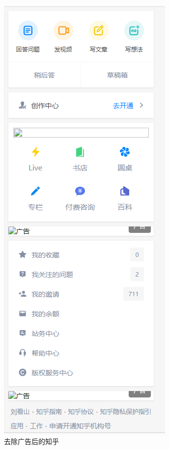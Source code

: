 \documentclass[UTF8]{article}
\begin{document}
\begin{minipage}{\linewidth/2}
\begin{figure}[H]
	\centering
	\includegraphics[width=\linewidth/3*2]{zhihu_noad.png}
	\caption{去除广告后的知乎}
\end{figure}\par
\end{minipage}
\end{document}
